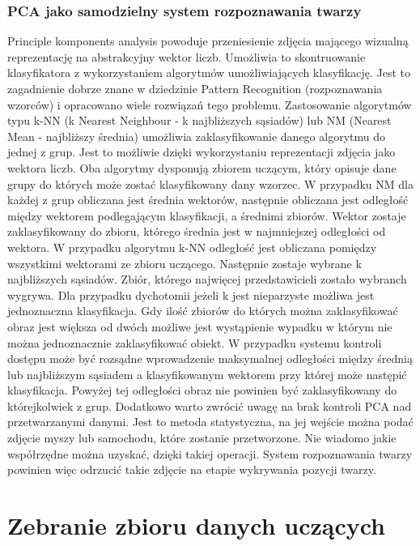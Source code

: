 \documentclass{article}
\begin{document}
\subsubsection{PCA jako samodzielny system rozpoznawania twarzy}
Principle komponents analysis powoduje przeniesienie zdjęcia mającego wizualną reprezentację na abstrakcyjny wektor liczb. Umożliwia to skontruowanie klasyfikatora z wykorzystaniem algorytmów umożliwiających klasyfikację. Jest to zagadnienie dobrze znane w dziedzinie Pattern Recognition (rozpoznawania wzorców) i opracowano wiele rozwiązań tego problemu. Zastosowanie algorytmów typu k-NN (k Nearest Neighbour - k najbliższych sąsiadów) lub NM (Nearest Mean - najbliższy średnia) umożliwia zaklasyfikowanie danego algorytmu do jednej z grup. Jest to możliwie dzięki wykorzystaniu reprezentacji zdjęcia jako wektora liczb. Oba algorytmy dysponują zbiorem uczącym, który opisuje dane grupy do których może zostać klasyfikowany dany wzorzec. 
W przypadku NM dla każdej z grup obliczana jest średnia wektorów, następnie obliczana jest odległość między wektorem podlegającym klasyfikacji, a średnimi zbiorów. Wektor zostaje zaklasyfikowany do zbioru, którego średnia jest w najmniejszej odległości od wektora. 
W przypadku algorytmu k-NN odległość jest obliczana pomiędzy wszystkimi wektorami ze zbioru uczącego. Następnie zostaje wybrane k najbliższych sąsiadów. Zbiór, którego najwięcej przedstawicieli zostało wybranch wygrywa. Dla przypadku dychotomii jeżeli k jest nieparzyste możliwa jest jednoznaczna klasyfikacja. Gdy ilość zbiorów do których można zaklasyfikować obraz jest większa od dwóch możliwe jest wystąpienie wypadku w którym nie można jednoznacznie zaklasyfikować obiekt. 
W przypadku systemu kontroli dostępu może być rozsądne wprowadzenie maksymalnej odległości między średnią lub najbliższym sąsiadem a klasyfikowanym wektorem przy której może następić klasyfikacja. Powyżej tej odległości obraz nie powinien być zaklasyfikowany do którejkolwiek z grup. 
Dodatkowo warto zwrócić uwagę na brak kontroli PCA nad przetwarzanymi danymi. Jest to metoda statystyczna, na jej wejście można podać zdjęcie myszy lub samochodu, które zostanie przetworzone. Nie wiadomo jakie współrzędne można uzyskać, dzięki takiej operacji. System rozpoznawania twarzy powinien więc odrzucić takie zdjęcie na etapie wykrywania pozycji twarzy.
 
 
\section{Zebranie zbioru danych uczących}
\end{document}
